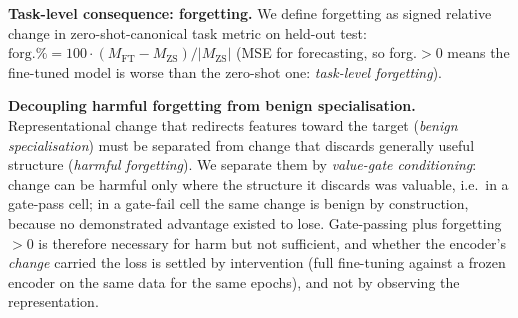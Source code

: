 \textbf{Task-level consequence: forgetting.}
We define forgetting as signed relative change in zero-shot-canonical
task metric on held-out test:
$\text{forg.\%} = 100 \cdot (M_{\text{FT}} - M_{\text{ZS}}) /
|M_{\text{ZS}}|$ (MSE for forecasting, so forg.${>}0$ means the fine-tuned model is
worse than the zero-shot one: \emph{task-level forgetting}).

\textbf{Decoupling harmful forgetting from benign specialisation.}
Representational change that redirects features toward the target
(\emph{benign specialisation}) must be separated from change that discards
generally useful structure (\emph{harmful forgetting}).  We separate them by
\emph{value-gate conditioning}:
change can be harmful only where the structure it discards was valuable, i.e.\ in
a gate-pass cell; in a gate-fail cell the same change is benign by construction,
because no demonstrated advantage existed to lose.  Gate-passing plus
forgetting${>}0$ is therefore necessary for harm but not sufficient, and whether
the encoder's \emph{change} carried the loss is settled by intervention (full
fine-tuning against a frozen encoder on the same data for the same epochs), and
not by observing the representation.

